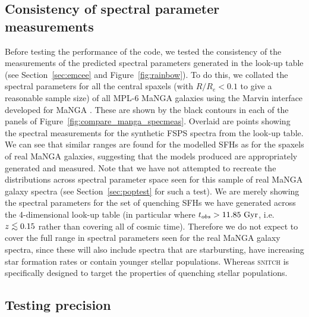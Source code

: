 \documentclass[useAMS,usenatbib]{mn2e}
\def\lesssim{\mathrel{\hbox{\rlap{\hbox{\lower3pt\hbox{$\sim$}}}\hbox{\raise2pt\hbox{$<$}}}}}
\begin{document}
\subsection{Consistency of spectral parameter measurements}\label{sec:consistency}


Before testing the performance of the code, we tested the consistency of the measurements of the predicted spectral parameters generated in the look-up table (see Section~\ref{sec:emcee} and Figure~\ref{fig:rainbow}). To do this, we collated the spectral parameters for all the central spaxels (with $R/R_e < 0.1$ to give a reasonable sample size) of all MPL-6 MaNGA galaxies using the Marvin interface developed for MaNGA \citep{cherinka18}. These are shown by the black contours in each of the panels of Figure~\ref{fig:compare_manga_specmeas}. Overlaid are points showing the spectral measurements for the synthetic FSPS spectra from the look-up table. We can see that similar ranges are found for the modelled SFHs as for the spaxels of real MaNGA galaxies, suggesting that the models produced are appropriately generated and measured. Note that we have not attempted to recreate the distributions across spectral parameter space seen for this sample of real MaNGA galaxy spectra (see Section~\ref{sec:poptest} for such a test). We are merely showing the spectral parameters for the set of quenching SFHs we have generated across the 4-dimensional look-up table (in particular where $t_{obs} > 11.85~\rm{Gyr}$, i.e. $z \lesssim 0.15$ rather than covering all of cosmic time). Therefore we do not expect to cover the full range in spectral parameters seen for the real MaNGA galaxy spectra, since these will also include spectra that are starbursting, have increasing star formation rates or contain younger stellar populations. Whereas \textsc{snitch} is specifically designed to target the properties of quenching stellar populations. 


\subsection{Testing precision}\label{sec:precisiontest}

\end{document}
